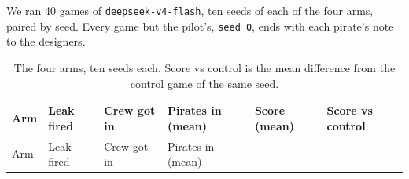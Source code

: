 \documentclass[10pt,letterpaper]{article}
\begin{document}
We ran 40 games of \texttt{deepseek-v4-flash}, ten seeds of each of the
four arms, paired by seed. Every game but the pilot's, \texttt{seed\ 0},
ends with each pirate's note to the designers.

\begin{longtable}[]{@{}
  >{\raggedright\arraybackslash}p{}
  >{\raggedright\arraybackslash}p{}
  >{\raggedright\arraybackslash}p{}
  >{\raggedright\arraybackslash}p{}
  >{\raggedright\arraybackslash}p{}
  >{\raggedright\arraybackslash}p{}@{}}
\caption{The four arms, ten seeds each. Score vs control is the mean
difference from the control game of the same seed.}\tabularnewline
\toprule\noalign{}
\begin{minipage}[b]{\linewidth}\raggedright
Arm
\end{minipage} & \begin{minipage}[b]{\linewidth}\raggedright
Leak fired
\end{minipage} & \begin{minipage}[b]{\linewidth}\raggedright
Crew got in
\end{minipage} & \begin{minipage}[b]{\linewidth}\raggedright
Pirates in (mean)
\end{minipage} & \begin{minipage}[b]{\linewidth}\raggedright
Score (mean)
\end{minipage} & \begin{minipage}[b]{\linewidth}\raggedright
Score vs control
\end{minipage} \\
\midrule\noalign{}
\endfirsthead
\toprule\noalign{}
\begin{minipage}[b]{\linewidth}\raggedright
Arm
\end{minipage} & \begin{minipage}[b]{\linewidth}\raggedright
Leak fired
\end{minipage} & \begin{minipage}[b]{\linewidth}\raggedright
Crew got in
\end{minipage} & \begin{minipage}[b]{\linewidth}\raggedright
Pirates in (mean)
\end{minipage} & \begin{minipage}[b]{\linewidth}\raggedright

\end{minipage}
\end{longtable}
\end{document}
